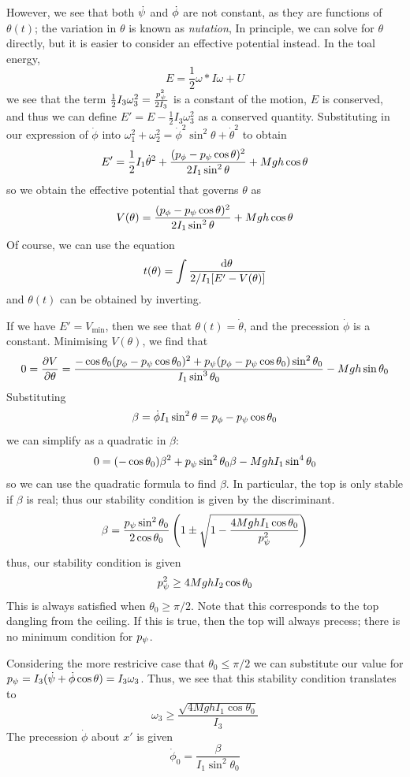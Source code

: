 However, we see that both \(\dot{\psi}\) and \(\dot{\phi}\) are not constant, as they are functions of \(\theta(t)\); the variation in \(\theta\) is known as \emph{nutation}, In principle, we can solve for \(\theta\) directly, but it is easier to consider an effective potential instead. In the toal energy,
\[E = \frac{1}{2}\omega * I\omega +U\]
we see that the term \(\frac{1}{2}I_3\omega^2_3 = \frac{p_\psi^2}{2I_3}\) is a constant of the motion, \(E\) is conserved, and thus we can define \(E' = E-\frac{1}{2}I_3\omega_3^2\) as a conserved quantity. Substituting in our expression of \(\dot\phi\) into \(\omega_1^2+\omega_2^2=\dot\phi^2\sin^2\theta+\dot\theta^2\) to obtain
\[E' = \frac{1}{2}I_1\dot\theta^2 + \frac{(p_\phi - p_\psi\cos\theta)^2}{2I_1\sin^2\theta}+Mgh\cos\theta\]
so we obtain the effective potential that governs \(\theta\) as
\[V(\theta) = \frac{(p_\phi - p_\psi\cos\theta)^2}{2I_1\sin^2\theta}+Mgh\cos\theta\]
Of course, we can use the equation
\[t(\theta) = \int\frac{\d\theta}{2/I_1[E'-V(\theta)]}\]
and \(\theta(t)\) can be obtained by inverting.

If we have \(E'=V_{\min}\), then we see that \(\theta(t)=\dot\theta\), and the precession \(\dot\phi\) is a constant. Minimising \(V(\theta)\), we find that
\[0 = \frac{\partial V}{\partial \theta} = \frac{-\cos\theta_0 (p_\phi-p_\psi \cos\theta_0)^2+p_\psi(p_\phi-p_\psi\cos\theta_0)\sin^2\theta_0}{I_1\sin^3\theta_0}-Mgh\sin\theta_0\]
Substituting 
\[\beta = \dot{\phi} I_1\sin^2\theta = p_\phi-p_\psi\cos\theta_0\]
we can simplify as a quadratic in \(\beta\):
\[0 = (-\cos\theta_0)\beta^2 + p_\psi \sin^2\theta_0 \beta - MghI_1\sin^4\theta_0\]
so we can use the quadratic formula to find \(\beta\). In particular, the top is only stable if \(\beta\) is real; thus our stability condition is given by the discriminant.
\[\beta = \frac{p_\psi\sin^2\theta_0}{2\cos\theta_0}\left(1\pm \sqrt{1-\frac{4 MghI_1\cos\theta_0}{p_\psi^2}}\right)\]
thus, our stability condition is given
\[p_\psi^2\geq 4MghI_2\cos\theta_0\]
This is always satisfied when \(\theta_0\geq\pi/2\). Note that this corresponds to the top dangling from the ceiling. If this is true, then the top will always precess; there is no minimum condition for \(p_\psi\).

Considering the more restricive case that \(\theta_0\le\pi/2\) we can substitute our value for \(p_\psi  =I_3(\dot{\psi}+\dot{\phi}\cos\theta) = I_3\omega_3\). Thus, we see that this stability condition translates to
\[\omega_3\geq \frac{\sqrt{4MghI_1\cos\theta_0}}{I_3}\]
The precession \(\dot\phi\) about \(x'\) is given
\[\dot\phi_0 = \frac{\beta}{I_1\sin^2\theta_0}\]

